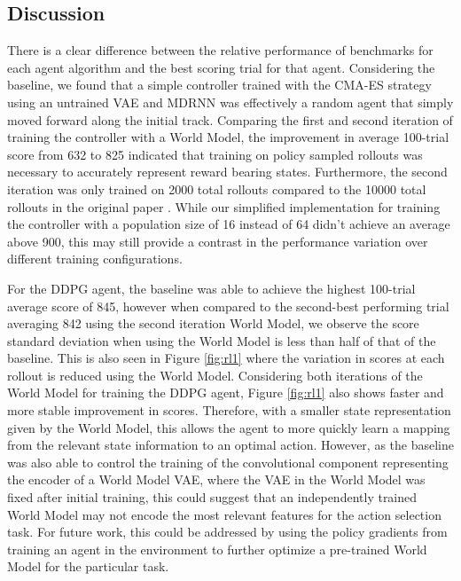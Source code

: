 \subsection{Discussion}

There is a clear difference between the relative performance of benchmarks for each agent algorithm and the best scoring trial for that agent. Considering the baseline, we found that a simple controller trained with the CMA-ES strategy using an untrained VAE and MDRNN was effectively a random agent that simply moved forward along the initial track. Comparing the first and second iteration of training the controller with a World Model, the improvement in average 100-trial score from 632 to 825 indicated that training on policy sampled rollouts was necessary to accurately represent reward bearing states. Furthermore, the second iteration was only trained on 2000 total rollouts compared to the 10000 total rollouts in the original paper \cite{1.0.0}. While our simplified implementation for training the controller with a population size of 16 instead of 64 didn't achieve an average above 900, this may still provide a contrast in the performance variation over different training configurations.

For the DDPG agent, the baseline was able to achieve the highest 100-trial average score of 845, however when compared to the second-best performing trial averaging 842 using the second iteration World Model, we observe the score standard deviation when using the World Model is less than half of that of the baseline. This is also seen in Figure \ref{fig:rl1} where the variation in scores at each rollout is reduced using the World Model. Considering both iterations of the World Model for training the DDPG agent, Figure \ref{fig:rl1} also shows faster and more stable improvement in scores. Therefore, with a smaller state representation given by the World Model, this allows the agent to more quickly learn a mapping from the relevant state information to an optimal action. However, as the baseline was also able to control the training of the convolutional component representing the encoder of a World Model VAE, where the VAE in the World Model was fixed after initial training, this could suggest that an independently trained World Model may not encode the most relevant features for the action selection task. For future work, this could be addressed by using the policy gradients from training an agent in the environment to further optimize a pre-trained World Model for the particular task.

